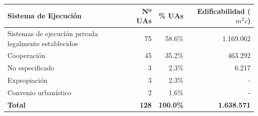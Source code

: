 \begin{tabular}{p{6.8cm}rrr}
  \toprule
  \textbf{Sistema de Ejecución} & \textbf{Nº UAs} & \textbf{\% UAs} & \textbf{Edificabilidad ($m^2c$)} \\
  \midrule
  Sistemas de ejecución privada legalmente establecidos & 75 & 58.6\% & 1.169.062 \\
  Cooperación & 45 & 35.2\% & 463.292 \\
  No especificado & 3 & 2.3\% & 6.217 \\
  Expropiación & 3 & 2.3\% & - \\
  Convenio urbanístico & 2 & 1.6\% & - \\
  \midrule
  \textbf{Total} & \textbf{128} & \textbf{100.0\%} & \textbf{1.638.571} \\
  \bottomrule
\end{tabular}
